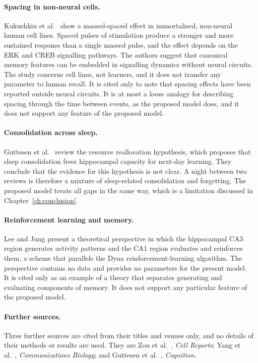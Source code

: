 \paragraph{Spacing in non-neural cells.}
Kukushkin et al.\ \cite{kukushkin2024massed} show a massed-spaced effect in immortalised, non-neural human cell
lines. Spaced pulses of stimulation produce a stronger and more sustained response than a single massed pulse,
and the effect depends on the ERK and CREB signalling pathways. The authors suggest that canonical memory features can be embedded in signalling dynamics without neural
circuits. The study concerns cell lines, not learners, and it does not transfer any parameter to human
recall. It is cited only to note that spacing effects have been reported outside neural circuits. It is at
most a loose analogy for describing spacing through the time between events, as the proposed model does, and
it does not support any feature of the proposed model.

\paragraph{Consolidation across sleep.}
Guttesen et al.\ \cite{guttesen2026memory} review the resource reallocation hypothesis, which proposes that
sleep consolidation frees hippocampal capacity for next-day learning. They conclude that the evidence for this
hypothesis is not clear. A night between two reviews is therefore a mixture of sleep-related consolidation and
forgetting. The proposed model treats all gaps in the same way, which is a limitation discussed in
Chapter~\ref{ch:conclusion}.

\paragraph{Reinforcement learning and memory.}
Lee and Jung \cite{lee2025memory} present a theoretical perspective in which the hippocampal CA3 region generates
activity patterns and the CA1 region evaluates and reinforces them, a scheme that parallels the Dyna
reinforcement-learning algorithm. The perspective contains no data and provides no parameters for the present
model. It is cited only as an example of a theory that separates generating and evaluating components of memory.
It does not support any particular feature of the proposed model.

\paragraph{Further sources.}
Three further sources are cited from their titles and venues only, and no details of their methods or results are
used. They are Zou et al.\ \cite{zou2025cell}, \emph{Cell Reports}; Yang et al.\ \cite{yang2025commbio},
\emph{Communications Biology}; and Guttesen et al.\ \cite{guttesen2025cognition}, \emph{Cognition}.

